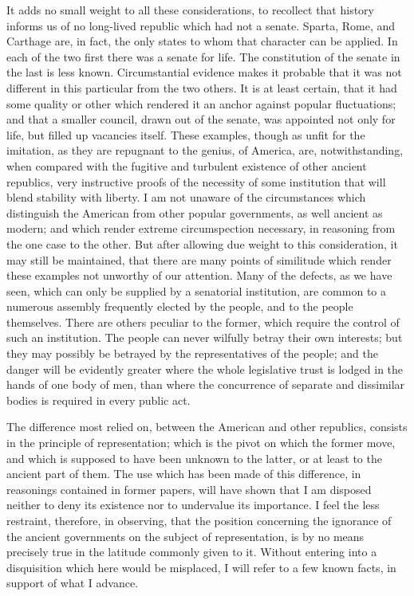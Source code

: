 It adds no small weight to all these considerations, to recollect that history informs us of no long-lived republic which had not a senate. Sparta, Rome, and Carthage are, in fact, the only states to whom that character can be applied. In each of the two first there was a senate for life. The constitution of the senate in the last is less known. Circumstantial evidence makes it probable that it was not different in this particular from the two others. It is at least certain, that it had some quality or other which rendered it an anchor against popular fluctuations; and that a smaller council, drawn out of the senate, was appointed not only for life, but filled up vacancies itself. These examples, though as unfit for the imitation, as they are repugnant to the genius, of America, are, notwithstanding, when compared with the fugitive and turbulent existence of other ancient republics, very instructive proofs of the necessity of some institution that will blend stability with liberty. I am not unaware of the circumstances which distinguish the American from other popular governments, as well ancient as modern; and which render extreme circumspection necessary, in reasoning from the one case to the other. But after allowing due weight to this consideration, it may still be maintained, that there are many points of similitude which render these examples not unworthy of our attention. Many of the defects, as we have seen, which can only be supplied by a senatorial institution, are common to a numerous assembly frequently elected by the people, and to the people themselves. There are others peculiar to the former, which require the control of such an institution. The people can never wilfully betray their own interests; but they may possibly be betrayed by the representatives of the people; and the danger will be evidently greater where the whole legislative trust is lodged in the hands of one body of men, than where the concurrence of separate and dissimilar bodies is required in every public act.

The difference most relied on, between the American and other republics, consists in the principle of representation; which is the pivot on which the former move, and which is supposed to have been unknown to the latter, or at least to the ancient part of them. The use which has been made of this difference, in reasonings contained in former papers, will have shown that I am disposed neither to deny its existence nor to undervalue its importance. I feel the less restraint, therefore, in observing, that the position concerning the ignorance of the ancient governments on the subject of representation, is by no means precisely true in the latitude commonly given to it. Without entering into a disquisition which here would be misplaced, I will refer to a few known facts, in support of what I advance.

